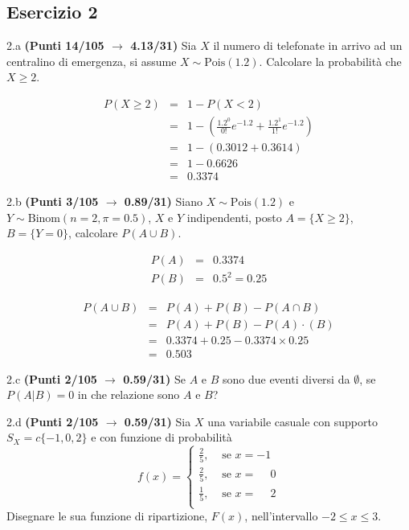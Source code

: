 \documentclass[
  11pt,
]{book}
\theoremstyle{mytheoremstyle}
\theoremstyle{mydefstyle}
\newenvironment{sol}
  {
  \begin{tcolorbox}[enhanced,breakable,arc=0.1mm,boxrule=1pt,colback=white,colframe=iblue,
  title=\bf \fontfamily{lmss}\selectfont \hspace{.5 cm} Soluzione,drop fuzzy shadow]

}{
\end{tcolorbox}
  }
\begin{document}
\subsection{Esercizio 2}\label{esercizio-2-39}

2.a \textbf{(Punti 14/105 \(\rightarrow\) 4.13/31)} Sia \(X\) il numero di telefonate in arrivo ad un centralino di emergenza, si assume \(X\sim\text{Pois}(1.2)\). Calcolare la probabilità che \(X\geq 2\).

\begin{sol}
\begin{eqnarray*}
   P( X \geq 2 ) &=& 1-P( X < 2 ) \\                 &=& 1-\left( \frac{ 1.2 ^{ 0 }}{ 0 !}e^{- 1.2 }+\frac{ 1.2 ^{ 1 }}{ 1 !}e^{- 1.2 } \right)\\                 &=& 1-( 0.3012+0.3614 )\\                 &=& 1- 0.6626 \\                 &=&   0.3374 
\end{eqnarray*}

\end{sol}

2.b \textbf{(Punti 3/105 \(\rightarrow\) 0.89/31)} Siano \(X\sim\text{Pois}(1.2)\) e \(Y\sim\text{Binom}(n=2,\pi=0.5)\), \(X\) e \(Y\) indipendenti, posto \(A=\{X\geq 2\}\), \(B=\{Y=0\}\), calcolare \(P(A\cup B)\).

\begin{sol}
\begin{eqnarray*}
  P(A) &=&  0.3374\\
  P(B) &=& 0.5^2 = 0.25
\end{eqnarray*}

\begin{eqnarray}
      P( A \cup B ) &=& P( A )+P( B )-P( A \cap B ) \\
                         &=& P( A )+P( B )-P( A )\cdot ( B ) \\
                         &=&  0.3374 + 0.25 - 0.3374 \times 0.25  \\
                         &=&  0.503 \end{eqnarray}

\end{sol}

2.c \textbf{(Punti 2/105 \(\rightarrow\) 0.59/31)} Se \(A\) e \(B\) sono due eventi diversi da \(\emptyset\), se
\(P(A|B)=0\) in che relazione sono \(A\) e \(B\)?

2.d \textbf{(Punti 2/105 \(\rightarrow\) 0.59/31)} Sia \(X\) una variabile casuale con supporto \(S_X=c\{-1,0,2\}\) e con funzione di probabilità
\[
f(x)=\begin{cases}
\frac 25, &\text{ se $x=-1$}\\
\frac 25, &\text{ se $x=\phantom{-} 0$}\\
\frac 15, &\text{ se $x=\phantom{-} 2$}\\
\end{cases}
\]
Disegnare le sua funzione di ripartizione, \(F(x)\), nell'intervallo \(-2\leq x\leq 3\).
\end{document}
